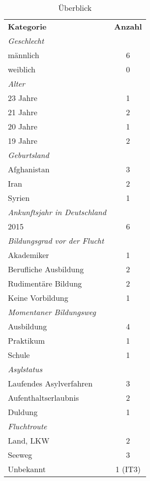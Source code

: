 \begin{table}[h!]
  \begin{center}
    \caption{Überblick}
    \label{tab:table1}
      \begin{tabular}{l|c|}
      \textbf{Kategorie} & \textbf{Anzahl}\\
        \newline
      \textit{Geschlecht}\\
      \hline
      männlich & 6\\
      weiblich & 0\\
      \hline
      \newline
      \textit{Alter}\\
      \hline
      23 Jahre & 1\\
      21 Jahre & 2\\
      20 Jahre & 1\\
      19 Jahre & 2\\
      \hline
      \newline
      \textit{Geburtsland}\\
      \hline
      Afghanistan & 3\\
      Iran & 2\\
      Syrien & 1\\
      \hline
      \newline
      \textit{Ankunftsjahr in Deutschland}\\
      \hline
      2015 & 6\\
      \hline
      \newline
      \textit{Bildungsgrad vor der Flucht}\\
      \hline
      Akademiker & 1\\
      Berufliche Ausbildung & 2\\
      Rudimentäre Bildung & 2\\
      Keine Vorbildung & 1\\
      \hline
      \newline
      \textit{Momentaner Bildungsweg}\\
      \hline
      Ausbildung & 4\\
      Praktikum & 1\\
      Schule & 1\\
      \hline
      \newline
      \textit{Asylstatus}\\
      \hline
      Laufendes Asylverfahren & 3\\
      Aufenthaltserlaubnis  & 2\\
      Duldung & 1\\
      \hline
      \newline
      \textit{Fluchtroute}\\
      \hline
      Land, LKW & 2\\
      Seeweg & 3\\
      Unbekannt & 1 (IT3)\\
      \end{tabular}
  \end{center}
\end{table}
